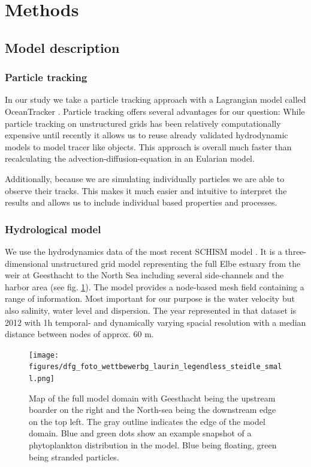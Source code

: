\documentclass[npg, manuscript]{copernicus}
\begin{document}
\section{Methods}
\subsection{Model description}

\subsubsection{Particle tracking}

In our study we take a particle tracking approach with a Lagrangian model called OceanTracker \citep{Vennell2021}.
Particle tracking offers several advantages for our question:
While particle tracking on unstructured grids has been relatively computationally expensive until recently \citep{Vennell2021}
it allows us to reuse already validated hydrodynamic models to model tracer like objects.
This approach is overall much faster than recalculating the advection-diffusion-equation in an Eularian model.

Additionally, because we are simulating individually particles we are able to observe their tracks.
This makes it much easier and intuitive to interpret the results and allows us to include individual based properties and processes.

\subsubsection{Hydrological model}
We use the hydrodynamics data of the most recent SCHISM model \citep{Pein2021}.
It is a three-dimensional unstructured  grid model representing the full Elbe estuary from the weir at Geesthacht to the North Sea including several side-channels and the harbor area (see fig. \ref{fig:model_domain}). 
The model provides a node-based mesh field containing a range of information.
Most important for our purpose is the water velocity but also salinity, water level and dispersion.
The year represented in that dataset is 2012 with 1h temporal- and dynamically varying spacial resolution with a median distance between nodes of approx. 60 \unit{m}.

\begin{figure}
    \texttt{[image: figures/dfg\_foto\_wettbewerbg\_laurin\_legendless\_steidle\_small.png]}
    \caption{Map of the full model domain with Geesthacht being the upstream boarder on the right and the North-sea being the downstream edge on the top left. The gray outline indicates the edge of the model domain. Blue and green dots show an example snapshot of a phytoplankton distribution in the model. Blue being floating, green being stranded particles.}
    \label{fig:model_domain}
\end{figure}
\end{document}
